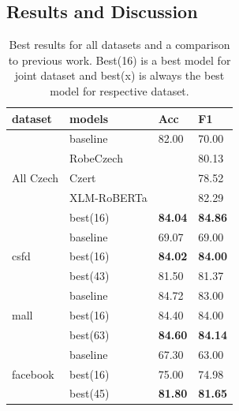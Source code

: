
\subsection{Results and Discussion}
\begin{table}[!h]
\centering
\begin{tabular}{|l|l||ll|}
\hline
dataset                    & models      & Acc   & F1    \\ \hline \hline
\multirow{5}{*}{All Czech} & baseline    & 82.00 & 70.00 \\ \cline{2-4} 
                           & RobeCzech   &       & 80.13 \\ \cline{2-4} 
                           & Czert       &       & 78.52 \\ \cline{2-4} 
                           & XLM-RoBERTa &       & 82.29 \\ \cline{2-4} 
                           & best(16)    & \textbf{84.04} & \textbf{84.86} \\ \hline \hline
\multirow{3}{*}{csfd}      & baseline    & 69.07 & 69.00 \\ \cline{2-4} 
                           & best(16)    & \textbf{84.02} & \textbf{84.00} \\ \cline{2-4} 
                           & best(43)    & 81.50 & 81.37 \\ \hline \hline
\multirow{3}{*}{mall}      & baseline    & 84.72 & 83.00 \\ \cline{2-4} 
                           & best(16)    & 84.40 & 84.00 \\ \cline{2-4} 
                           & best(63)    & \textbf{84.60} & \textbf{84.14} \\ \hline \hline
\multirow{3}{*}{facebook}  & baseline    & 67.30 & 63.00 \\ \cline{2-4} 
                           & best(16)    & 75.00 & 74.98 \\ \cline{2-4} 
                           & best(45)    & \textbf{81.80} & \textbf{81.65} \\ \hline
\end{tabular}
\caption{Best results for all datasets and a comparison to previous work. Best(16) is a best model for joint dataset and best(x) is always the best model for respective dataset.}
\label{tab:res_sent_best}
\end{table}


